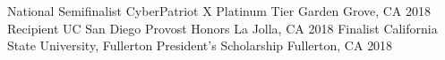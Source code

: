 

\begin{cvhonors}

  \cvhonor
    {National Semifinalist} %
    {CyberPatriot X Platinum Tier} %
    {Garden Grove, CA} %
    {2018} %
  \cvhonor
    {Recipient} %
    {UC San Diego Provost Honors} %
    {La Jolla, CA} %
    {2018} %
 \cvhonor
    {Finalist} %
    {California State University, Fullerton President's Scholarship} %
    {Fullerton, CA} %
    {2018} %

\end{cvhonors}
